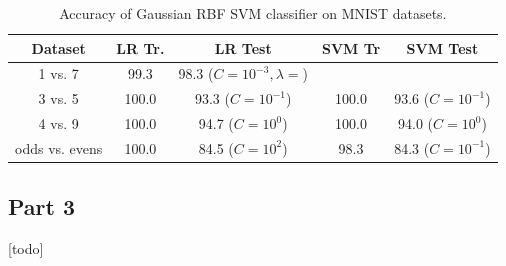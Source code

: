 \begin{table}[ht!]
\centering
\begin{tabular}{||c c c c c||}  
 \hline
 Dataset & LR Tr. & LR Test & SVM Tr & SVM Test \\ [0.3ex] 
 \hline\hline
 1 vs. 7 & 99.3 & 98.3 ($C=10^{-3}, \lambda=$) \\ 
 \hline
 3 vs. 5 & 100.0 & 93.3 ($C=10^{-1}$) & 100.0 & 93.6 ($C=10^{-1}$) \\ 
 \hline
 4 vs. 9 & 100.0 & 94.7 ($C=10^{0}$) & 100.0 & 94.0 ($C=10^{0}$) \\ 
 \hline
 odds vs. evens & 100.0 & 84.5 ($C=10^{2}$) & 98.3 & 84.3 ($C=10^{-1}$) \\ 
 \hline
\end{tabular}
\caption{Accuracy of Gaussian RBF SVM classifier on MNIST datasets.}
\label{table_4_2}
\end{table}

\subsection{Part 3}
[todo]

